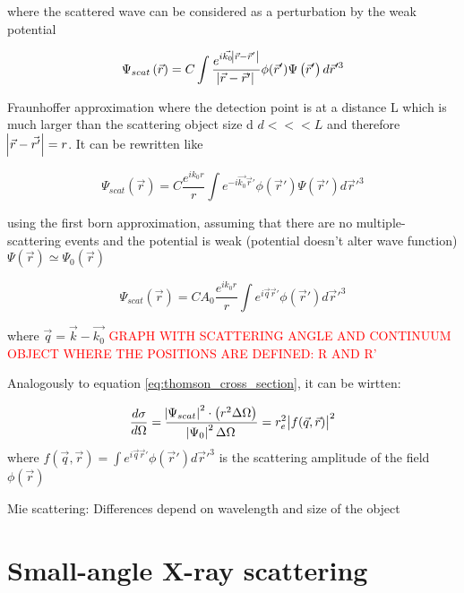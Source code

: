 where the scattered wave can be considered as a perturbation by the weak potential

\begin{equation}
       \Psi_{scat}\left( \vec{r} \right)=C \int \frac{e^{ i \vec{k_0}\abs{\vec{r}-\vec{r}'} } } {\abs{\vec{r}-\vec{r}'}} \phi(\vec{r}')   \Psi\left( \vec{r}' \right) d\vec{r}'^3
\end{equation}

Fraunhoffer approximation where the detection point is at a distance L which is much larger than the scattering object size d $d<<<L$ and therefore $\abs{\vec{r}-\vec{r'}}=r$. It can be rewritten like

\begin{equation}
       \Psi_{scat}\left( \vec{r} \right)=C \frac{e^{i k_0 r}}{r} \int e^{ -i \vec{k_0}\vec{r}' }  \phi(\vec{r}')   \Psi\left( \vec{r}' \right) d\vec{r}'^3
\end{equation}

using the first born approximation, assuming that there are no multiple-scattering events and the potential is weak (potential doesn't alter wave function)  $ \Psi\left( \vec{r} \right) \simeq \Psi_0\left( \vec{r} \right)$

\begin{equation}
       \Psi_{scat}\left( \vec{r} \right)=C A_0 \frac{e^{i k_0 r}}{r} \int e^{ i \vec{q}\vec{r}' }  \phi(\vec{r}')  d\vec{r}'^3
\end{equation}

where $\vec{q}=\vec{k} - \vec{k_0}$ \textcolor{red}{GRAPH WITH SCATTERING ANGLE AND CONTINUUM OBJECT WHERE THE POSITIONS ARE DEFINED: R AND R'}

Analogously to equation \ref{eq:thomson_cross_section}, it can be wirtten:

\begin{equation}
        \label{eq:rayleigh_cross_section}
        \frac{d\sigma}{d\Omega}= \frac{\abs{\Psi_{scat}}^2 \cdot \left(r^2 \Delta \Omega \right)}{\abs{\Psi_{0}}^2\Delta \Omega}=r_e^2 \abs{f(\vec{q},\vec{r})}^2
\end{equation}
where $f(\vec{q},\vec{r})=\int e^{ i \vec{q}\vec{r}' }  \phi(\vec{r}')  d\vec{r}'^3$ is the scattering amplitude of the field $\phi(\vec{r})$

Mie scattering: Differences depend on wavelength and size of the object

\section{Small-angle X-ray scattering}

